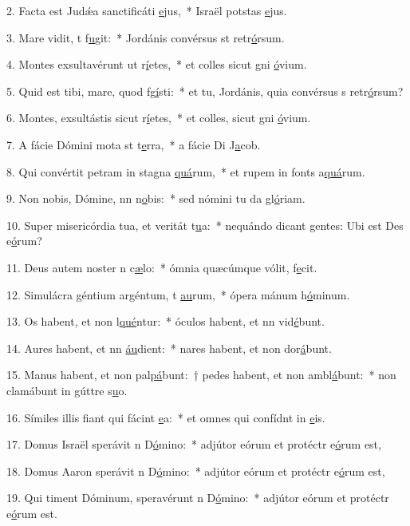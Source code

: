 2. Facta est Judǽa sanctificáti \uline{e}jus,~* Israël potstas \uline{e}jus.\par 
3. Mare vidit, t f\uline{u}git:~* Jordánis convérsus st retr\uline{ó}rsum.\par 
4. Montes exsultavérunt ut r\uline{í}etes,~* et colles sicut gni \uline{ó}vium.\par 
5. Quid est tibi, mare, quod fg\uline{í}sti:~* et tu, Jordánis, quia convérsus s retr\uline{ó}rsum?\par 
6. Montes, exsultástis sicut r\uline{í}etes,~* et colles, sicut gni \uline{ó}vium.\par 
7. A fácie Dómini mota st t\uline{e}rra,~* a fácie Di J\uline{a}cob.\par 
8. Qui convértit petram in stagna \uline{quá}rum,~* et rupem in fonts a\uline{quá}rum.\par 
9. Non nobis, Dómine, nn n\uline{o}bis:~* sed nómini tu da gl\uline{ó}riam.\par 
10. Super misericórdia tua, et veritát t\uline{u}a:~* nequándo dicant gentes: Ubi est Des e\uline{ó}rum?\par 
11. Deus autem noster n c\uline{æ}lo:~* ómnia quæcúmque vólit, f\uline{e}cit.\par 
12. Simulácra géntium argéntum, t \uline{au}rum,~* ópera mánum h\uline{ó}minum.\par 
13. Os habent, et non l\uline{qué}ntur:~* óculos habent, et nn vid\uline{é}bunt.\par 
14. Aures habent, et nn \uline{áu}dient:~* nares habent, et non dor\uline{á}bunt.\par 
15. Manus habent, et non pal\uline{pá}bunt:~† pedes habent, et non ambl\uline{á}bunt:~* non clamábunt in gúttre s\uline{u}o.\par 
16. Símiles illis fiant qui fácint \uline{e}a:~* et omnes qui confídnt in \uline{e}is.\par 
17. Domus Israël sperávit n D\uline{ó}mino:~* adjútor eórum et protéctr e\uline{ó}rum est,\par 
18. Domus Aaron sperávit n D\uline{ó}mino:~* adjútor eórum et protéctr e\uline{ó}rum est,\par 
19. Qui timent Dóminum, speravérunt n D\uline{ó}mino:~* adjútor eórum et protéctr e\uline{ó}rum est.\par 
